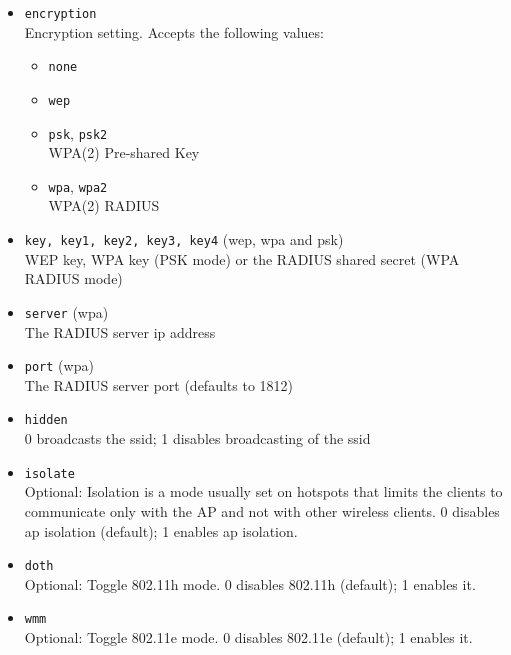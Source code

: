 \begin{itemize}
    \item \texttt{encryption} \\
        Encryption setting. Accepts the following values:

        \begin{itemize}
	    \item \texttt{none}
	    \item \texttt{wep}
            \item \texttt{psk}, \texttt{psk2} \\
                WPA(2) Pre-shared Key

            \item \texttt{wpa}, \texttt{wpa2} \\
                WPA(2) RADIUS
        \end{itemize}

    \item \texttt{key, key1, key2, key3, key4} (wep, wpa and psk) \\
        WEP key, WPA key (PSK mode) or the RADIUS shared secret (WPA RADIUS mode)

    \item \texttt{server} (wpa) \\
        The RADIUS server ip address

    \item \texttt{port} (wpa) \\
        The RADIUS server port (defaults to 1812)

    \item \texttt{hidden} \\
        0 broadcasts the ssid; 1 disables broadcasting of the ssid

    \item \texttt{isolate} \\
        Optional: Isolation is a mode usually set on hotspots that limits the clients to communicate only with the AP and not with other wireless clients.
        0 disables ap isolation (default); 1 enables ap isolation.

    \item \texttt{doth} \\
        Optional: Toggle 802.11h mode.
        0 disables 802.11h (default); 1 enables it.

    \item \texttt{wmm} \\
        Optional: Toggle 802.11e mode.
        0 disables 802.11e (default); 1 enables it.

\end{itemize}

